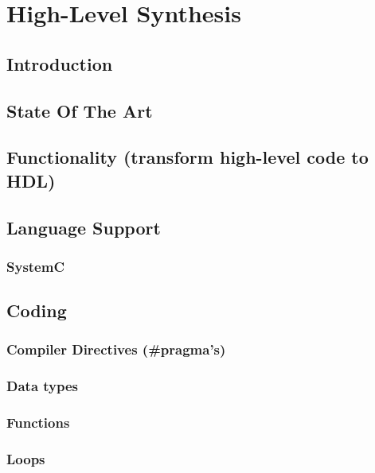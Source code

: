\chapter{High-Level Synthesis}
\label{cha:HLS}

\section{Introduction}

\section{State Of The Art}

\section{Functionality (transform high-level code to HDL)}

\section{Language Support}

  \subsection{\cplusplus}

  \subsection{SystemC}

\section{Coding}

  \subsection{Compiler Directives (\#pragma's)}

  \subsection{Data types}

  \subsection{Functions}

  \subsection{Loops}

